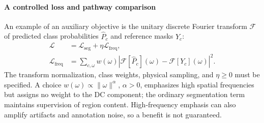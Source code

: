 \documentclass[5p,times,authoryear]{elsarticle}
\begin{document}
\paragraph{A controlled loss and pathway comparison}
An example of an auxiliary objective is the unitary discrete Fourier transform $\mathcal F$ of predicted class probabilities $\hat P_c$ and reference masks $Y_c$:
\begin{equation}
\begin{aligned}
\mathcal L &= \mathcal L_{\mathrm{seg}}+\eta\mathcal L_{\mathrm{freq}},\\
\mathcal L_{\mathrm{freq}}
 &=\sum_{c,\omega}w(\omega)
 \left|\mathcal F[\hat P_c](\omega)-\mathcal F[Y_c](\omega)\right|^2 .
\end{aligned}
\end{equation}
The transform normalization, class weights, physical sampling, and $\eta\geq0$ must be specified. A choice $w(\omega)\propto\|\omega\|^\alpha$, $\alpha>0$, emphasizes high spatial frequencies but assigns no weight to the DC component; the ordinary segmentation term maintains supervision of region content. High-frequency emphasis can also amplify artifacts and annotation noise, so a benefit is not guaranteed.
\end{document}
